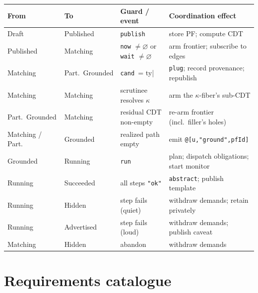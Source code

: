 \documentclass[11pt]{article}
\newcommand{\code}[1]{\lstinline[language=rho,basicstyle=\ttfamily\small]|#1|}
\begin{document}
\begin{center}\small
\renewcommand{\arraystretch}{1.2}
\begin{tabular}{@{}l l l l@{}}
\toprule
\textbf{From} & \textbf{To} & \textbf{Guard / event} & \textbf{Coordination effect} \\
\midrule
Draft & Published & \code{publish} & store PF; compute CDT \\
Published & Matching & \code{now} $\neq\varnothing$ or \code{wait} $\neq\varnothing$ & arm frontier; subscribe to edges \\
Matching & Part.\ Grounded & \code{cand |= ty} & \code{plug}; record provenance; republish \\
Matching & Matching & scrutinee resolves $\kappa$ & arm the $\kappa$-fiber's sub-CDT \\
Part.\ Grounded & Matching & residual CDT non-empty & re-arm frontier (incl.\ filler's holes) \\
Matching / Part. & Grounded & realized path empty & emit \code{@[u,"ground",pfId]} \\
Grounded & Running & \code{run} & plan; dispatch obligations; start monitor \\
Running & Succeeded & all steps \code{"ok"} & \code{abstract}; publish template \\
Running & Hidden & step fails (quiet) & withdraw demands; retain privately \\
Running & Advertised & step fails (loud) & withdraw demands; publish caveat \\
Matching & Hidden & abandon & withdraw demands \\
\bottomrule
\end{tabular}
\end{center}

\section{Requirements catalogue}\label{sec:reqs}
\newcommand{\req}[2]{\item[\textbf{#1}]\,#2}
\end{document}
